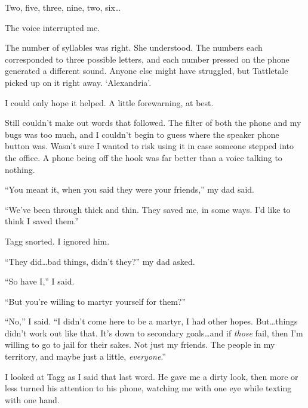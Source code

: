Two, five, three, nine, two, six\ldots



The voice interrupted me.



The number of syllables was right.  She understood.  The numbers each corresponded to three possible letters, and each number pressed on the phone generated a different sound.  Anyone else might have struggled, but Tattletale picked up on it right away.  `Alexandria'.



I could only hope it helped.  A little forewarning, at best.



Still couldn't make out words that followed.  The filter of both the phone and my bugs was too much, and I couldn't begin to guess where the speaker phone button was.  Wasn't sure I wanted to risk using it in case someone stepped into the office.  A phone being off the hook was far better than a voice talking to nothing.



``You meant it, when you said they were your friends,'' my dad said.



``We've been through thick and thin.  They saved me, in some ways.  I'd like to think I saved them.''



Tagg snorted.  I ignored him.



``They did\ldots bad things, didn't they?'' my dad asked.



``So have I,'' I said.



``But you're willing to martyr yourself for them?''



``No,'' I said.  ``I didn't come here to be a martyr, I had other hopes.  But\ldots things didn't work out like that.  It's down to secondary goals\ldots and if \emph{those} fail, then I'm willing to go to jail for their sakes.  Not just my friends.  The people in my territory, and maybe just a little, \emph{everyone}.''



I looked at Tagg as I said that last word.  He gave me a dirty look, then more or less turned his attention to his phone, watching me with one eye while texting with one hand.



